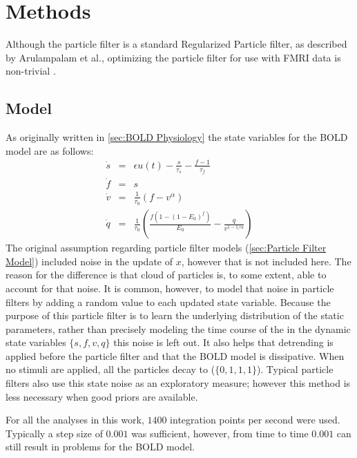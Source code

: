 \chapter{Methods}
\label{sec:Methods}
Although the particle filter  is a standard Regularized
Particle filter, as described by Arulampalam et al., optimizing the 
particle filter for use with FMRI data is non-trivial \cite{Arulampalam2002a}. 


\section{Model}
As originally written in \autoref{sec:BOLD Physiology} the state variables
for the BOLD model are as follows:
\begin{eqnarray}
\dot{s} &=& \epsilon u(t) - \frac{s}{\tau_s} - \frac{f - 1}{\tau_f} \\
\dot{f} &=& s\\
\dot{v} &=& \frac{1}{\tau_0}(f - v^\alpha)\\
\dot{q} &=& \frac{1}{\tau_0}(\frac{f(1-(1-E_0)^f)}{E_0} - \frac{q}{v^{1-1/\alpha}})
\end{eqnarray}
The original assumption regarding particle filter models (\autoref{sec:Particle Filter Model})
included noise in the update of $x$, however that is not included here.
The reason for the difference is that cloud of particles is, to some extent,
able to account for that noise. It is common, however, to model that noise
in particle filters by adding a random value to each updated state variable. 
Because the purpose of this particle filter is to learn the underlying distribution
of the static parameters, rather than precisely modeling the time course of the 
in the dynamic state variables $\{s,f,v,q\}$ this noise is left out. It also helps
that detrending is applied before the particle filter and that the
BOLD model is dissipative. When no stimuli are applied, all the particles 
decay to ($\{0,1,1,1\}$). Typical particle filters 
also use this state noise as an exploratory measure; however this method is
less necessary when good priors are available.

For all the analyses  in this work, $1400$ integration points
per second were used.  Typically a step size of $0.001$ was sufficient,
however, from time to time $0.001$ can still result in problems for the
BOLD model.

